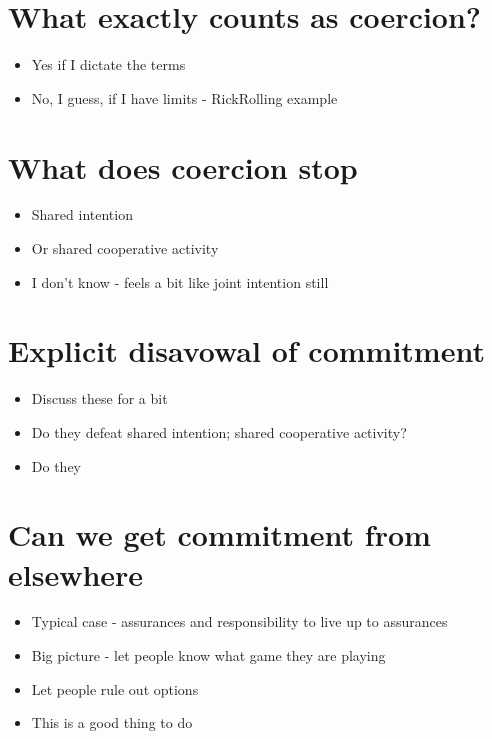 \section{What exactly counts as coercion?}
\label{whatexactlycountsascoercion}

\begin{itemize}
\item{} Yes if I dictate the terms

\item{} No, I guess, if I have limits - RickRolling example

\end{itemize}
\section{What does coercion stop}
\label{whatdoescoercionstop}

\begin{itemize}
\item{} Shared intention

\item{} Or shared cooperative activity

\item{} I don't know - feels a bit like joint intention still

\end{itemize}
\section{Explicit disavowal of commitment}
\label{explicitdisavowalofcommitment}

\begin{itemize}
\item{} Discuss these for a bit

\item{} Do they defeat shared intention; shared cooperative activity?

\item{} Do they

\end{itemize}
\section{Can we get commitment from elsewhere}
\label{canwegetcommitmentfromelsewhere}

\begin{itemize}
\item{} Typical case - assurances and responsibility to live up to assurances

\item{} Big picture - let people know what game they are playing

\item{} Let people rule out options

\item{} This is a good thing to do

\end{itemize}

